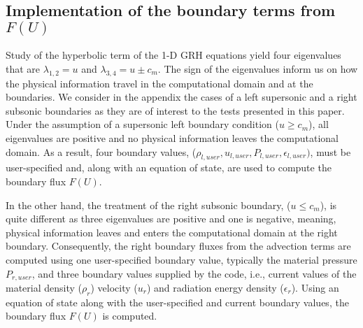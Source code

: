 \subsection{Implementation of the boundary terms from $F(U)$}
%
Study of the hyperbolic term of the 1-D GRH equations yield four eigenvalues that are $\lambda_{1,2}=u$ and $\lambda_{3,4}=u \pm c_m$. The sign of the eigenvalues inform us on how the physical information travel in the computational domain and at the boundaries. We consider in the appendix the cases of a left supersonic and a right subsonic boundaries as they are of interest to the tests presented in this paper. Under the assumption of a supersonic left boundary condition ($u \geq c_m$), all eigenvalues are positive and no physical information leaves the computational domain. As a result, four boundary values, ($\rho_{l, user}, u_{l, user}, P_{l, user}, \epsilon_{l, user})$, must be user-specified and, along with an equation of state, are used to compute the boundary flux $F(U)$. 

In the other hand, the treatment of the right subsonic boundary, ($u \leq c_m$), is quite different as three eigenvalues are positive and one is negative, meaning, physical information leaves and enters the computational domain at the right boundary. Consequently, the right boundary fluxes from the advection terms are computed using one user-specified boundary value, typically the material pressure $P_{r, user}$, and three boundary values supplied by the code, i.e., current values of the material density ($\rho_{r}$) velocity ($u_{r}$) and radiation energy density ($\epsilon_{r}$). Using an equation of state along with the user-specified and current boundary values, the boundary flux $F(U)$ is computed.
%
